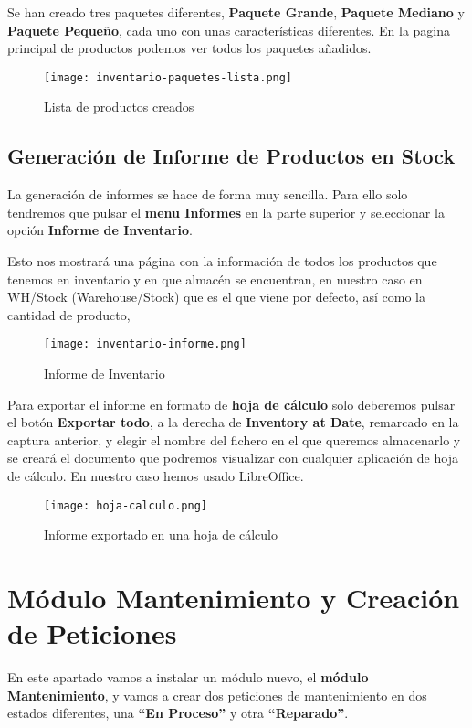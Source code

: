 Se han creado tres paquetes diferentes, \textbf{Paquete Grande}, \textbf{Paquete Mediano} y \textbf{Paquete Pequeño}, cada uno con unas características diferentes. En la pagina principal de productos podemos ver todos los paquetes añadidos.

\begin{figure}[ht]
    \centering
    \texttt{[image: inventario-paquetes-lista.png]}
    \caption{Lista de productos creados}
\end{figure}

\vspace{8ex}

\subsection{Generación de Informe de Productos en Stock}
La generación de informes se hace de forma muy sencilla. Para ello solo tendremos que pulsar el \textbf{menu Informes} en la parte superior y seleccionar la opción \textbf{Informe de Inventario}.

Esto nos mostrará una página con la información de todos los productos que tenemos en inventario y en que almacén se encuentran, en nuestro caso en WH/Stock (Warehouse/Stock) que es el que viene por defecto, así como la cantidad de producto,

\begin{figure}[ht]
    \centering
    \texttt{[image: inventario-informe.png]}
    \caption{Informe de Inventario}
\end{figure}

Para exportar el informe en formato de \textbf{hoja de cálculo} solo deberemos pulsar el botón \textbf{Exportar todo}, a la derecha de \textbf{Inventory at Date}, remarcado en la captura anterior, y elegir el nombre del fichero en el que queremos almacenarlo y se creará el documento que podremos visualizar con cualquier aplicación de hoja de cálculo. En nuestro caso hemos usado LibreOffice.

\begin{figure}[ht]
    \centering
    \texttt{[image: hoja-calculo.png]}
    \caption{Informe exportado en una hoja de cálculo}
\end{figure}

\section{Módulo Mantenimiento y Creación de Peticiones}
En este apartado vamos a instalar un módulo nuevo, el \textbf{módulo Mantenimiento}, y vamos a crear dos peticiones de mantenimiento en dos estados diferentes, una \textbf{``En Proceso''} y otra \textbf{``Reparado''}.

